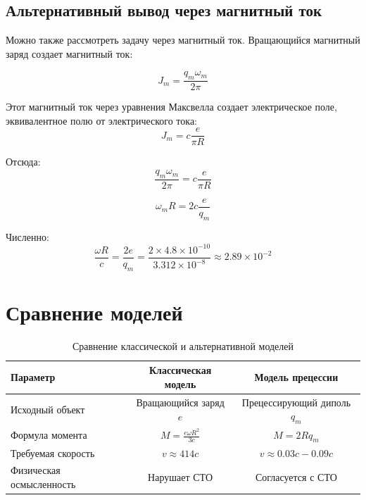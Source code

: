 \documentclass[12pt,a4paper]{article}
\begin{document}
\subsection{Альтернативный вывод через магнитный ток}

Можно также рассмотреть задачу через магнитный ток. Вращающийся магнитный заряд создает магнитный ток:

\begin{equation}
J_m = \frac{q_m \omega_m}{2\pi}
\end{equation}

Этот магнитный ток через уравнения Максвелла создает электрическое поле, эквивалентное полю от электрического тока:
\begin{equation}
J_m = c \frac{e}{\pi R}
\end{equation}

Отсюда:
\begin{equation}
\frac{q_m \omega_m}{2\pi} = c \frac{e}{\pi R}
\end{equation}

\begin{equation}
\omega_m R = 2c \frac{e}{q_m}
\end{equation}

Численно:
\begin{equation}
\frac{\omega R}{c} = \frac{2e}{q_m} = \frac{2 \times 4.8 \times 10^{-10}}{3.312 \times 10^{-8}} \approx 2.89 \times 10^{-2}
\end{equation}

\section{Сравнение моделей}

\begin{table}[h]
\centering
\begin{tabular}{|l|c|c|}
\hline
\textbf{Параметр} & \textbf{Классическая модель} & \textbf{Модель прецессии} \\
\hline
Исходный объект & Вращающийся заряд $e$ & Прецессирующий диполь $q_m$ \\
\hline
Формула момента & $M = \frac{e\omega R^2}{3c}$ & $M = 2R q_m$ \\
\hline
Требуемая скорость & $v \approx 414c$ & $v \approx 0.03c - 0.09c$ \\
\hline
Физическая осмысленность & Нарушает СТО & Согласуется с СТО \\
\hline
\end{tabular}
\caption{Сравнение классической и альтернативной моделей}
\label{tab:comparison}
\end{table}
\end{document}
